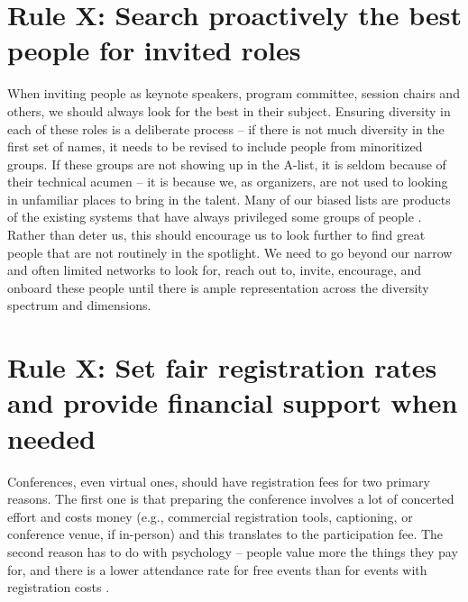 \documentclass[10pt,letterpaper]{article}
\begin{document}
\section{Rule X: Search proactively the best people for invited roles}

When inviting people as keynote speakers, program committee, session chairs and others, we should always look for the best in their subject. Ensuring diversity in each of these roles is a deliberate process -- if there is not much diversity in the first set of names, it needs to be revised to include people from minoritized groups. If these groups are not showing up in the A-list, it is seldom because of their technical acumen -- it is because we, as organizers, are not used to looking in unfamiliar places to bring in the talent. Many of our biased lists are products of the existing systems that have always privileged some groups of people \cite{dwyer_notice_2021, sarabipour_evaluating_2020}. Rather than deter us, this should encourage us to look further to find great people that are not routinely in the spotlight. We need to go beyond our narrow and often limited networks to look for, reach out to, invite, encourage, and onboard these people until there is ample representation across the diversity spectrum and dimensions. 




\section{Rule X: Set fair registration rates and provide financial support when needed}

Conferences, even virtual ones, should have registration fees for two primary reasons. The first one is that preparing the conference involves a lot of concerted effort and costs money (e.g., commercial registration tools, captioning, or conference venue, if in-person) and this translates to the participation fee. The second reason has to do with psychology -- people value more the things they pay for, and there is a lower attendance rate for free events than for events with registration costs \cite{eventbrite_ultimate_2017}. 
\end{document}
